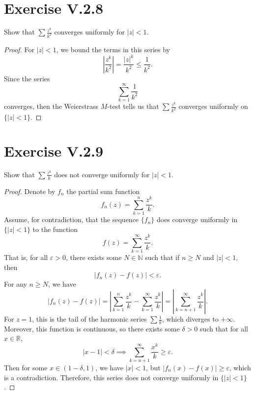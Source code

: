 \documentclass[12pt]{article}
\newenvironment{problem}
    {\begin{lrbox}{\mybox}\begin{minipage}{0.98\textwidth}}
    {\end{minipage}\end{lrbox}\framebox[\textwidth]{\usebox{\mybox}}}
\newcommand{\ds}{\displaystyle}
\newcommand{\N}{\mathbb{N}}
\newcommand{\R}{\mathbb{R}}
\newcommand{\eps}{\varepsilon}
\begin{document}
\newpage
\section{Exercise V.2.8}
\begin{problem}
    Show that $\ds \sum \frac{z^k}{k^2}$ converges uniformly for $|z| < 1$.
\end{problem}

\begin{proof}
    For $|z| < 1$, we bound the terms in this series by
    \[
        \left| \frac{z^k}{k^2} \right| = \frac{|z|^k}{k^2} \leq \frac{1}{k^2}.
    \]
    Since the series 
    \[
        \sum_{k=1}^\infty \frac{1}{k^2}
    \]
    converges, then the Weierstrass $M$-test tells us that $\ds \sum \frac{z^k}{k^2}$ converges uniformly on $\{|z| < 1\}$.
    
\end{proof}

\section{Exercise V.2.9}
\begin{problem}
    Show that $\ds \sum \frac{z^k}{k}$ does not converge uniformly for $|z| < 1$.
\end{problem}

\begin{proof}
    Denote by $f_n$ the partial sum function
    \[
        f_n(z) = \sum_{k=1}^n \frac{z^k}{k}.
    \]
    Assume, for contradiction, that the sequence $\{f_n\}$ does converge uniformly in $\{|z| < 1\}$ to the function
    \[
        f(z) = \sum_{k=1}^\infty \frac{z^k}{k}.
    \]
    That is, for all $\eps > 0$, there exists some $N \in \N$ such that if $n \geq N$ and $|z| < 1$, then
    \[
        |f_n(z) - f(z)| < \eps.
    \]
    For any $n \geq N$, we have
    \[
        |f_n(z) - f(z)|
            = \left| \sum_{k=1}^n \frac{z^k}{k} - \sum_{k=1}^\infty \frac{z^k}{k} \right|
            = \left| \sum_{k=n+1}^\infty \frac{z^k}{k} \right|.
    \]
    For $z = 1$, this is the tail of the harmonic series $\sum \frac1k$, which diverges to $+\infty$. Moreover, this function is continuous, so there exists some $\delta > 0$ such that for all $x \in \R$,
    \[
        |x - 1| < \delta \implies \sum_{k=n+1}^\infty \frac{x^k}{k} \geq \eps.
    \]
    Then for some $x \in (1-\delta, 1)$, we have $|x| < 1$, but $|f_n(x) - f(x)| \geq \eps$, which is a contradiction. Therefore, this series does not converge uniformly in $\{|z| < 1\}$.
    
\end{proof}
\end{document}
